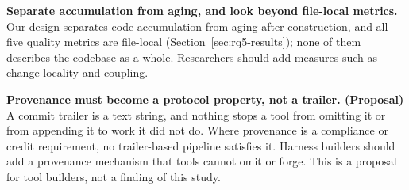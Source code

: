\textbf{Separate accumulation from aging, and look beyond file-local metrics.}
Our design separates code accumulation from aging after construction, and all
five quality metrics are file-local (Section~\ref{sec:rq5-results}); none of
them describes the codebase as a whole.
Researchers should add measures such as change locality and coupling.


\textbf{Provenance must become a protocol property, not a trailer. (Proposal)}
A commit trailer is a text string, and nothing stops a tool from omitting it or
from appending it to work it did not do.
Where provenance is a compliance or credit requirement, no trailer-based
pipeline satisfies it.
Harness builders should add a provenance mechanism that tools cannot omit or
forge.
This is a proposal for tool builders, not a finding of this study.
